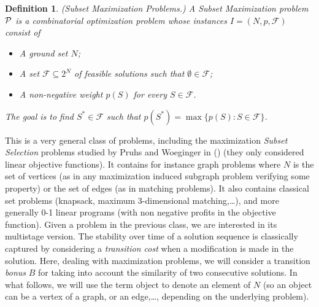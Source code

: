 \documentclass[a4paper]{book}
\newtheorem{definition}{Definition}
\begin{document}
\begin{definition}

\emph{(Subset Maximization Problems.)} A Subset Maximization problem $\cal P$ is a combinatorial optimization problem whose instances $I=(N,p,\mathcal{F})$ consist of
\begin{itemize}
    \item A ground set $N$;
    \item A set $\mathcal{F}\subseteq 2^N$ of feasible solutions such that $\emptyset\in\mathcal{F}$;
    \item A non-negative weight $p(S)$ for every $S \in \mathcal{F}$.
\end{itemize}
The goal is to find $S^*\in \mathcal{F}$ such that $p(S^*)=\max\{p(S):S\in\mathcal{F}\}$.
\end{definition}
This is a very general class of problems, including the maximization \emph{Subset Selection} problems studied by Pruhs and Woeginger in (\cite{Pruhs}) (they only considered linear objective functions). It contains for instance graph problems where $N$ is the set of vertices (as in any maximization induced subgraph problem verifying some property) or the set of edges (as in  matching problems). It also contains classical set problems (knapsack, maximum 3-dimensional matching,\dots), and more generally 0-1 linear programs (with non negative profits in the objective function).
Given a problem in the previous class, we are interested in its multistage version.
The stability over time of a solution sequence is classically captured by considering a \textit{transition cost} when a modification is made in the solution. Here, dealing with maximization problems, we will consider a transition {\it bonus} $B$ for taking into account the similarity of two consecutive solutions.
In what follows, we will use the term object to denote an element of $N$ (so an object can be a vertex of a graph, or an edge,\dots, depending on the underlying problem). 	%
\end{document}
